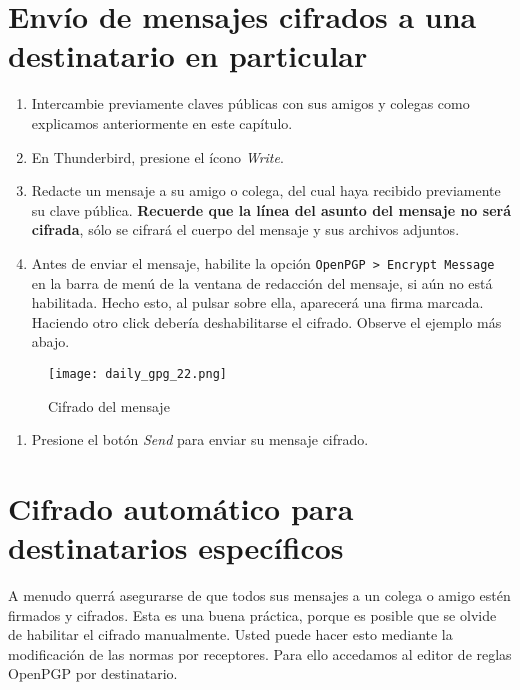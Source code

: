 \documentclass[10pt,a5paper,twoside,,]{book}
\providecommand{\tightlist}{%
  \setlength{\itemsep}{0pt}\setlength{\parskip}{0pt}}
\begin{document}
\section{Envío de mensajes cifrados a una destinatario en
particular}\label{envuxedo-de-mensajes-cifrados-a-una-destinatario-en-particular}

\begin{enumerate}
\def\labelenumi{\arabic{enumi}.}
\item
  Intercambie previamente claves públicas con sus amigos y colegas como
  explicamos anteriormente en este capítulo.
\item
  En Thunderbird, presione el ícono \emph{Write}.
\item
  Redacte un mensaje a su amigo o colega, del cual haya recibido
  previamente su clave pública. \textbf{Recuerde que la línea del asunto
  del mensaje no será cifrada}, sólo se cifrará el cuerpo del mensaje y
  sus archivos adjuntos.
\item
  Antes de enviar el mensaje, habilite la opción
  \texttt{OpenPGP\ \textgreater{}\ Encrypt\ Message} en la barra de menú
  de la ventana de redacción del mensaje, si aún no está habilitada.
  Hecho esto, al pulsar sobre ella, aparecerá una firma marcada.
  Haciendo otro click debería deshabilitarse el cifrado. Observe el
  ejemplo más abajo.
\end{enumerate}

\begin{figure}[htbp]
\centering
\texttt{[image: daily\_gpg\_22.png]}
\caption{Cifrado del mensaje}
\end{figure}

\begin{enumerate}
\def\labelenumi{\arabic{enumi}.}
\setcounter{enumi}{4}
\tightlist
\item
  Presione el botón \emph{Send} para enviar su mensaje cifrado.
\end{enumerate}

\section{Cifrado automático para destinatarios
específicos}\label{cifrado-automuxe1tico-para-destinatarios-especuxedficos}

A menudo querrá asegurarse de que todos sus mensajes a un colega o amigo
estén firmados y cifrados. Esta es una buena práctica, porque es posible
que se olvide de habilitar el cifrado manualmente. Usted puede hacer
esto mediante la modificación de las normas por receptores. Para ello
accedamos al editor de reglas OpenPGP por destinatario.
\end{document}
